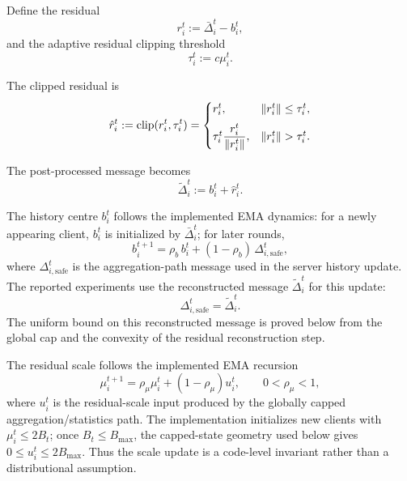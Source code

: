 Define the residual
\begin{equation}
    r_i^t := \bar{\Delta}_i^t - b_i^t,
    \label{eq:residual}
\end{equation}
and the adaptive residual clipping threshold
\begin{equation}
    \tau_i^t := c \mu_i^t.
    \label{eq:tau}
\end{equation}

The clipped residual is
\begin{equation}
    \hat{r}_i^t
    :=
    \operatorname{clip}(r_i^t, \tau_i^t)
    =
    \begin{cases}
        r_i^t, & \left\lVert r_i^t \right\rVert \le \tau_i^t,\\[2mm]
        \tau_i^t \dfrac{r_i^t}{\left\lVert r_i^t \right\rVert}, & \left\lVert r_i^t \right\rVert > \tau_i^t.
    \end{cases}
    \label{eq:residual_clip}
\end{equation}

The post-processed message becomes
\begin{equation}
    \tilde{\Delta}_i^t := b_i^t + \hat{r}_i^t.
    \label{eq:delta_tilde}
\end{equation}

The history centre \(b_i^t\) follows the implemented EMA dynamics:
for a newly appearing client, \(b_i^t\) is initialized by
\(\bar{\Delta}_i^t\); for later rounds,
\begin{equation}
    b_i^{t+1}
    =
    \rho_b\, b_i^t + (1-\rho_b)\,\Delta_{i,\mathrm{safe}}^t,
    \label{eq:b_update}
\end{equation}
where \(\Delta_{i,\mathrm{safe}}^t\) is the aggregation-path message used in
the server history update. The reported experiments use the reconstructed
message \(\tilde{\Delta}_i^t\) for this update:
\begin{equation}
    \Delta_{i,\mathrm{safe}}^t=\tilde{\Delta}_i^t .
    \label{eq:safe_message_bound}
\end{equation}
The uniform bound on this reconstructed message is proved below from the global
cap and the convexity of the residual reconstruction step.

The residual scale follows the implemented EMA recursion
\begin{equation}
    \mu_i^{t+1}
    =
    \rho_\mu\mu_i^t+(1-\rho_\mu)u_i^t,
    \qquad
    0<\rho_\mu<1,
    \label{eq:mu_history_consistency}
\end{equation}
where \(u_i^t\) is the residual-scale input produced by the globally capped
aggregation/statistics path. The implementation initializes new clients with
\(\mu_i^t\le 2B_t\); once \(B_t\le B_{\max}\), the capped-state geometry used
below gives \(0\le u_i^t\le2B_{\max}\). Thus the scale update is a code-level
invariant rather than a distributional assumption.

